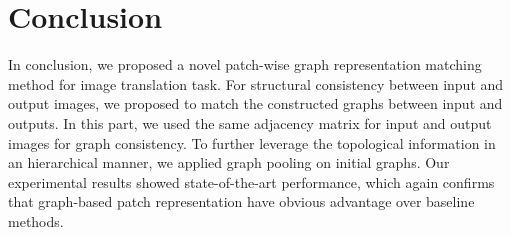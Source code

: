 \documentclass[letterpaper]{article} %
\begin{document}
\begin{table}[!t]
\begin{center}
\end{center}
\caption{Quantitative results of ablation studies. Our setting shows the best performance in both of FID and KID$\times$100.}
\label{table:ablation}
\end{table}



\vspace{-1.04mm}
\section{Conclusion}
In conclusion, we proposed a novel patch-wise graph representation matching method for image translation task. For structural consistency between input and output images, we proposed to match the constructed graphs between input and outputs. In this part, we used the same adjacency matrix for input and output images for graph consistency. To further leverage the topological information in an hierarchical manner, we applied graph pooling on initial graphs. Our experimental results showed state-of-the-art performance, which again confirms that graph-based patch representation have obvious advantage over baseline methods.
\end{document}
